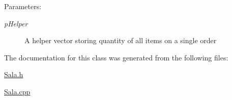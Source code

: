 \begin{Desc}
\item[Parameters:]
\begin{description}
\item[{\em p\-Helper}]A helper vector storing quantity of all items on a single order \end{description}
\end{Desc}


The documentation for this class was generated from the following files:\begin{CompactItemize}
\item 
\hyperlink{_sala_8h}{Sala.h}\item 
\hyperlink{_sala_8cpp}{Sala.cpp}\end{CompactItemize}

